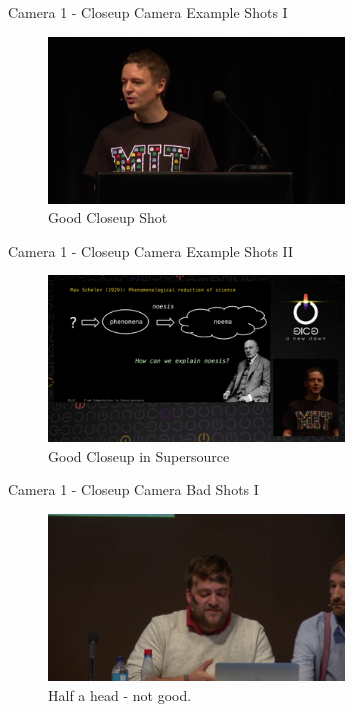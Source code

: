 \documentclass[aspectratio=169]{beamer}
\begin{document}
\begin{frame}{Camera 1 - Closeup Camera}
	Example Shots I
	\begin{figure} 
		\centering
		\includegraphics[width=0.7\textwidth]{images/closeup1.png}
		\caption{Good Closeup Shot}
		\label{fig:close1}
	\end{figure}
\end{frame}

\begin{frame}{Camera 1 - Closeup Camera}
	Example Shots II
	\begin{figure} 
		\centering
		\includegraphics[width=0.7\textwidth]{images/closeup2.png}
		\caption{Good Closeup in Supersource}
		\label{fig:close2}
	\end{figure}
\end{frame}

\begin{frame}{Camera 1 - Closeup Camera}
	Bad Shots I
	\begin{figure} 
		\centering
		\includegraphics[width=0.7\textwidth]{images/closeup-bad1.png}
		\caption{Half a head - not good.}
		\label{fig:closeb1}
	\end{figure}
\end{frame}
\end{document}
